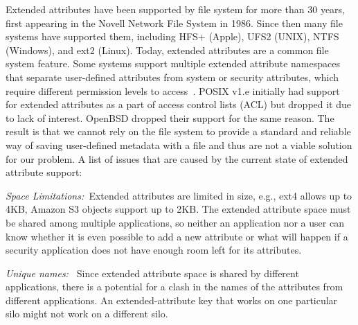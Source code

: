 


Extended attributes have been supported by file system for more than 30 years, first appearing in the Novell Network File System in 1986.
Since then many file systems have supported them, including HFS+ (Apple), UFS2 (UNIX), NTFS (Windows), and ext2 (Linux). 
Today, extended attributes are a common file system feature.
Some systems support multiple extended attribute namespaces that separate user-defined attributes from system or security attributes, 
which require different permission levels to access~\cite{man-xattr}. 
POSIX v1.e initially had support for extended attributes as a part of access control lists (ACL) but dropped it due to lack of interest\cite{posix-acl-linux}. 
OpenBSD dropped their support for the same reason\cite{extattr-openbsd}.
The result is that we cannot rely on the file system to provide a standard
and reliable way of saving user-defined metadata with a file and thus are not a viable solution for
our problem. A list of issues that are caused by the current state of extended attribute support:

\emph{Space Limitations:\ }Extended attributes are limited in size, e.g., ext4 allows up to 4KB, Amazon S3 objects support up to 2KB. The extended attribute space must be shared among multiple applications, so neither an application nor a user can know whether it is even possible to add a new attribute or what will happen if a security application does not have enough room left for its attributes.

\emph{Unique names:\ } Since extended attribute space is shared by different applications, there is a potential for a clash in the names of the attributes from different applications. An extended-attribute key that works on one particular silo might not work on a different silo.

